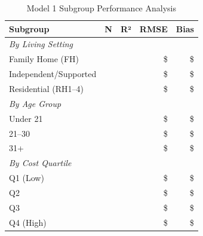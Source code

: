 \begin{table}[h]
\centering
\caption{Model 1 Subgroup Performance Analysis}
\begin{tabular}{lrrrr}
\toprule
\textbf{Subgroup} & \textbf{N} & \textbf{R²} & \textbf{RMSE} & \textbf{Bias} \\
\midrule
\multicolumn{5}{l}{\textit{By Living Setting}} \\
Family Home (FH) & \ModelOneSubgrouplivingFHN{} & \ModelOneSubgrouplivingFHRSquared{} & \$\ModelOneSubgrouplivingFHRMSE{} & \$\ModelOneSubgrouplivingFHBias{} \\
Independent/Supported & \ModelOneSubgrouplivingILSLN{} & \ModelOneSubgrouplivingILSLRSquared{} & \$\ModelOneSubgrouplivingILSLRMSE{} & \$\ModelOneSubgrouplivingILSLBias{} \\
Residential (RH1--4) & \ModelOneSubgrouplivingRHOneToFourN{} & \ModelOneSubgrouplivingRHOneToFourRSquared{} & \$\ModelOneSubgrouplivingRHOneToFourRMSE{} & \$\ModelOneSubgrouplivingRHOneToFourBias{} \\
\midrule
\multicolumn{5}{l}{\textit{By Age Group}} \\
Under 21 & \ModelOneSubgroupageAgeUnderTwentyOneN{} & \ModelOneSubgroupageAgeUnderTwentyOneRSquared{} & \$\ModelOneSubgroupageAgeUnderTwentyOneRMSE{} & \$\ModelOneSubgroupageAgeUnderTwentyOneBias{} \\
21--30 & \ModelOneSubgroupageAgeTwentyOneToThirtyN{} & \ModelOneSubgroupageAgeTwentyOneToThirtyRSquared{} & \$\ModelOneSubgroupageAgeTwentyOneToThirtyRMSE{} & \$\ModelOneSubgroupageAgeTwentyOneToThirtyBias{} \\
31+ & \ModelOneSubgroupageAgeThirtyOnePlusN{} & \ModelOneSubgroupageAgeThirtyOnePlusRSquared{} & \$\ModelOneSubgroupageAgeThirtyOnePlusRMSE{} & \$\ModelOneSubgroupageAgeThirtyOnePlusBias{} \\
\midrule
\multicolumn{5}{l}{\textit{By Cost Quartile}} \\
Q1 (Low) & \ModelOneSubgroupcostQOneLowN{} & \ModelOneSubgroupcostQOneLowRSquared{} & \$\ModelOneSubgroupcostQOneLowRMSE{} & \$\ModelOneSubgroupcostQOneLowBias{} \\
Q2 & \ModelOneSubgroupcostQTwoN{} & \ModelOneSubgroupcostQTwoRSquared{} & \$\ModelOneSubgroupcostQTwoRMSE{} & \$\ModelOneSubgroupcostQTwoBias{} \\
Q3 & \ModelOneSubgroupcostQThreeN{} & \ModelOneSubgroupcostQThreeRSquared{} & \$\ModelOneSubgroupcostQThreeRMSE{} & \$\ModelOneSubgroupcostQThreeBias{} \\
Q4 (High) & \ModelOneSubgroupcostQFourHighN{} & \ModelOneSubgroupcostQFourHighRSquared{} & \$\ModelOneSubgroupcostQFourHighRMSE{} & \$\ModelOneSubgroupcostQFourHighBias{} \\
\bottomrule
\end{tabular}
\end{table}

